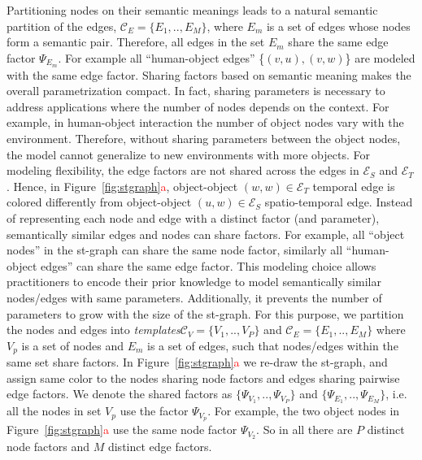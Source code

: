 \documentclass[10pt,twocolumn,letterpaper]{article}
\newcommand{\mcal}[1]{\mathcal{#1}}
\newcommand{\rc}[1]{\textcolor{red}{#1}}
\begin{document}
Partitioning nodes on their semantic meanings leads to a natural semantic partition of the edges, $\mcal{C}_E=\{E_1,..,E_M\}$, where $E_m$ is a set of edges whose nodes form a semantic pair. Therefore, all edges in the set $E_m$  share the same edge factor $\Psi_{E_m}$. For example all ``human-object edges'' \{$(v,u), (v,w)$\} are modeled with the same edge factor.  Sharing factors based on semantic meaning makes the overall parametrization compact. In fact, sharing parameters is necessary to address applications where the number of nodes depends on the context. For example, in human-object interaction the number of object nodes vary with the environment. Therefore, without sharing parameters between the object nodes, the model cannot generalize to new environments with more objects. For modeling flexibility, the edge factors are not shared across the edges in $\mcal{E}_S$ and $\mcal{E}_T$. Hence, in Figure~\ref{fig:stgraph}\rc{a}, object-object $(w,w)\in\mcal{E}_T$ temporal edge is colored differently from object-object $(u,w) \in \mcal{E}_S$ spatio-temporal edge.%
Instead of representing each node and edge  with a distinct factor (and parameter), semantically similar edges and nodes can share factors. For example, all ``object nodes'' in the st-graph can share the same node factor, similarly all ``human-object edges'' can share the same edge factor. This modeling choice allows practitioners to encode their prior knowledge to model semantically similar nodes/edges with same parameters. Additionally, it prevents the number of parameters to grow with the size of the st-graph. For this purpose, we partition the nodes and edges into \textit{templates}$\mcal{C}_V=\{V_1,..,V_P\}$ and $\mcal{C}_E=\{E_1,..,E_M\}$ where $V_p$ is a set of nodes and $E_m$ is a set of edges, such that nodes/edges within the same set share factors. In Figure~\ref{fig:stgraph}\rc{a} we re-draw the st-graph, and assign same color to the nodes sharing node factors and edges sharing pairwise edge factors. We denote the shared factors as $\{\Psi_{V_1},..,\Psi_{V_P}\}$ and $\{\Psi_{E_1},..,\Psi_{E_M}\}$, i.e. all the nodes in set $V_p$ use the factor $\Psi_{V_p}$.  For example, the two object nodes in Figure~\ref{fig:stgraph}\rc{a} use the same node factor $\Psi_{V_2}$.  So in all there are $P$ distinct node factors and $M$ distinct edge factors.  
\end{document}
